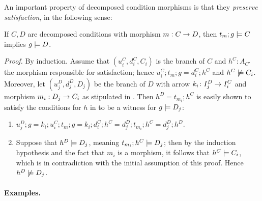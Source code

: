 %
\medskip\noindent An important property of decomposed condition morphisms is that they \emph{preserve satisfaction}, in the following sense:
%
\begin{proposition}
If $C,D$ are decomposed conditions with morphism $m:C\rightarrow D$, then $t_m;g\models C$ implies $g\models D$.
\end{proposition}
%
\emph{Proof.} By induction. Assume that $(u_i^C,d_i^C,C_i)$ is the branch of $C$ and $h^C\colon A_{C'}$ the morphism responsible for satisfaction; hence $u_i^C;t_m;g=d_i^C;h^C$ and $h^C\not\models C_i$. Moreover, let $(u_j^D,d_j^D,D_j)$ be the branch of $D$ with arrow $k_i\colon I_j^D\rightarrow I_i^C$ and morphism $m_i:D_j\rightarrow C_i$ as stipulated in . Then $h^D=t_{m_i};h^C$ is easily shown to satisfy the conditions for $h$ in  to be a witness for $g\models D_j$:
\begin{enumerate}
\item $u_j^D;g = k_i;u_i^C;t_m;g= k_i;d_i^C;h^C = d_j^D;t_{m_i};h^C=d_j^D;h^D$.
\item Suppose that $h^D\models D_j$, meaning $t_{m_i};h^C\models D_j$; then by the induction hypothesis and the fact that $m_i$ is a morphism, it follows that $h^C\models C_i$, which is in contradiction with the initial assumption of this proof. Hence $h^D\not\models D_j$.
\end{enumerate}
%
\paragraph{Examples.}

